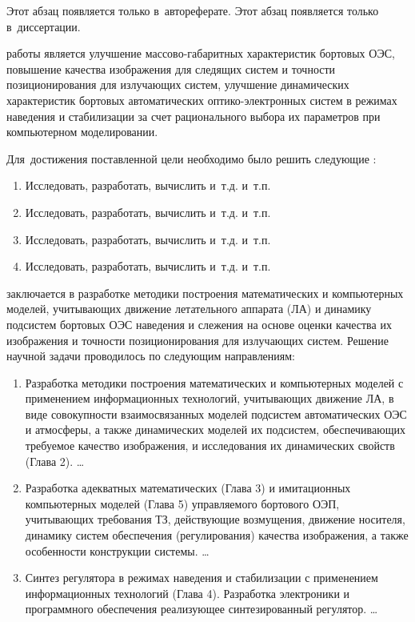 \ifsynopsis
Этот абзац появляется только в~автореферате.
\else
Этот абзац появляется только в~диссертации.
\fi


{\aim} работы является улучшение массово-габаритных характеристик бортовых ОЭС, повышение качества изображения для следящих систем и точности позиционирования для излучающих систем, улучшение динамических характеристик бортовых автоматических оптико-электронных систем в режимах наведения и стабилизации за счет рационального выбора их параметров при компьютерном моделировании.

Для~достижения поставленной цели необходимо было решить следующие {\tasks}:
\begin{enumerate}
  \item Исследовать, разработать, вычислить и~т.\:д. и~т.\:п.
  \item Исследовать, разработать, вычислить и~т.\:д. и~т.\:п.
  \item Исследовать, разработать, вычислить и~т.\:д. и~т.\:п.
  \item Исследовать, разработать, вычислить и~т.\:д. и~т.\:п.
\end{enumerate}


{\novelty} заключается в разработке методики построения математических и компьютерных моделей, учитывающих движение летательного аппарата (ЛА) и динамику подсистем бортовых ОЭС наведения и слежения на основе оценки качества их изображения и точности позиционирования для излучающих систем. Решение научной задачи проводилось по следующим направлениям:
\begin{enumerate}
  \item Разработка методики построения математических и компьютерных моделей с применением информационных технологий, учитывающих движение ЛА, в виде совокупности взаимосвязанных моделей подсистем автоматических ОЭС и атмосферы, а также динамических моделей их подсистем, обеспечивающих требуемое качество изображения, и исследования их динамических свойств (Глава 2). \ldots
  \item Разработка адекватных математических (Глава 3) и имитационных компьютерных моделей (Глава 5) управляемого бортового ОЭП, учитывающих требования ТЗ, действующие возмущения, движение носителя, динамику систем обеспечения (регулирования) качества изображения, а также особенности конструкции системы. \ldots
  \item Синтез регулятора в режимах наведения и стабилизации с применением информационных технологий (Глава 4). Разработка электроники и программного обеспечения реализующее синтезированный регулятор. \ldots
\end{enumerate}

